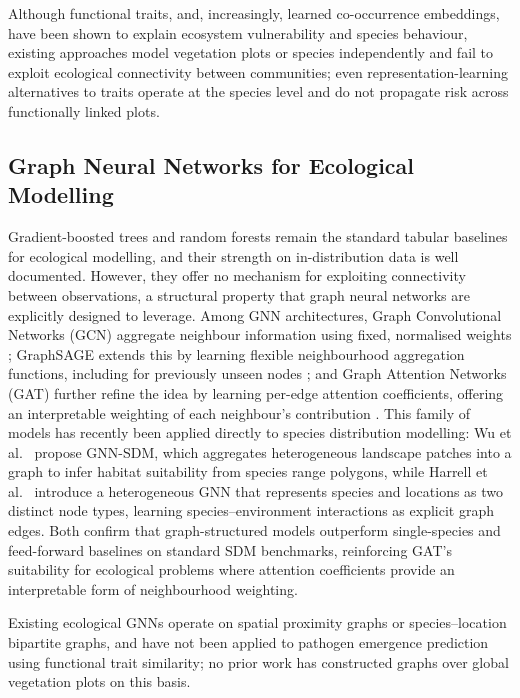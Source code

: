 \documentclass[a4paper,fleqn]{cas-sc}
\begin{document}
Although functional traits, and, increasingly, learned co-occurrence embeddings, have been shown to explain ecosystem vulnerability and species behaviour, existing approaches model vegetation plots or species independently and fail to exploit ecological connectivity between communities; even representation-learning alternatives to traits operate at the species level and do not propagate risk across functionally linked plots.

\subsection{Graph Neural Networks for Ecological Modelling}

Gradient-boosted trees and random forests remain the standard tabular baselines for ecological modelling, and their strength on in-distribution data is well documented. However, they offer no mechanism for exploiting connectivity between observations, a structural property that graph neural networks are explicitly designed to leverage. Among GNN architectures, Graph Convolutional Networks (GCN) aggregate neighbour information using fixed, normalised weights \citep{kipf2017}; GraphSAGE extends this by learning flexible neighbourhood aggregation functions, including for previously unseen nodes \citep{hamilton2017}; and Graph Attention Networks (GAT) further refine the idea by learning per-edge attention coefficients, offering an interpretable weighting of each neighbour's contribution \citep{velickovic2018}. This family of models has recently been applied directly to species distribution modelling: Wu et al.~\citep{wu2025} propose GNN-SDM, which aggregates heterogeneous landscape patches into a graph to infer habitat suitability from species range polygons, while Harrell et al.~\citep{harrell2025} introduce a heterogeneous GNN that represents species and locations as two distinct node types, learning species--environment interactions as explicit graph edges. Both confirm that graph-structured models outperform single-species and feed-forward baselines on standard SDM benchmarks, reinforcing GAT's suitability for ecological problems where attention coefficients provide an interpretable form of neighbourhood weighting.

Existing ecological GNNs operate on spatial proximity graphs or species--location bipartite graphs, and have not been applied to pathogen emergence prediction using functional trait similarity; no prior work has constructed graphs over global vegetation plots on this basis.
\end{document}
